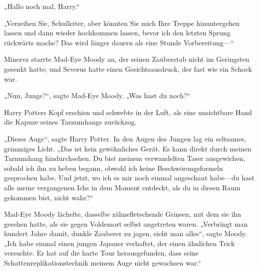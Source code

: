 \later

„Hallo noch mal, Harry.“

„Verzeihen Sie, Schulleiter, aber könnten Sie mich Ihre Treppe hinuntergehen lassen und dann wieder hochkommen lassen, bevor ich den letzten Sprung rückwärts mache? Das wird länger dauern als eine Stunde Vorbereitung—“

\later

Minerva starrte Mad-Eye Moody an, der seinen Zauberstab nicht im Geringsten gesenkt hatte; und Severus hatte einen Gesichtsausdruck, der fast wie ein Schock war.

„Nun, Junge?“, sagte Mad-Eye Moody. „Was hast du noch?“

Harry Potters Kopf erschien und schwebte in der Luft, als eine unsichtbare Hand die Kapuze seines Tarnumhangs zurückzog.

„Dieses Auge“, sagte Harry Potter. In den Augen des Jungen lag ein seltsames, grimmiges Licht. „Das ist kein gewöhnliches Gerät. Es kann direkt durch meinen Tarnumhang hindurchsehen. Du bist meinem verwandelten Taser ausgewichen, sobald ich ihn zu heben begann, obwohl ich keine Beschwörungsformeln gesprochen habe. Und jetzt, wo ich es mir noch einmal angeschaut habe—du hast alle meine vergangenen Ichs in dem Moment entdeckt, als du in diesen Raum gekommen bist, nicht wahr?“

Mad-Eye Moody lächelte, dasselbe zähnefletschende Grinsen, mit dem sie ihn gesehen hatte, als sie gegen Voldemort selbst angetreten waren.
„Verbringt man hundert Jahre damit, dunkle Zauberer zu jagen, sieht man alles“, sagte Moody. „Ich habe einmal einen jungen Japaner verhaftet, der einen ähnlichen Trick versuchte. Er hat auf die harte Tour herausgefunden, dass seine Schattenreplikationstechnik meinem Auge nicht gewachsen war.“

